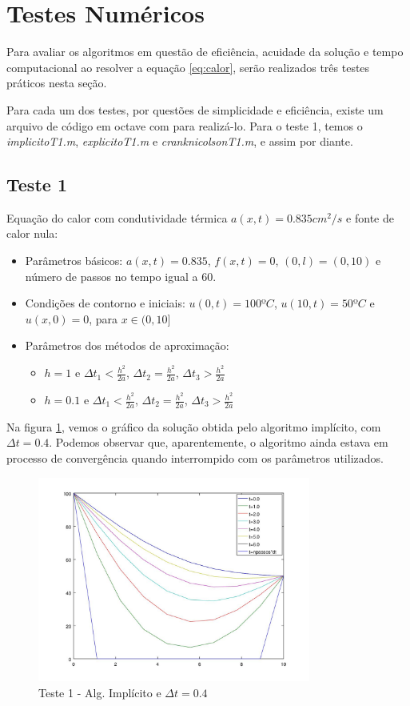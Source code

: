\documentclass[
	11pt,				%
	oneside,			%
	a4paper,			%
	english,			%
	brazil,				%
	]{article}
\begin{document}
\section{Testes Numéricos}
Para avaliar os algoritmos em questão de eficiência, acuidade da solução e 
tempo computacional ao resolver a equação \ref{eq:calor}, serão realizados três 
testes práticos nesta seção.

Para cada um dos testes, por questões de simplicidade e eficiência, existe um 
arquivo de código em octave com para realizá-lo. Para o teste 1, temos o 
\textit{implicitoT1.m}, \textit{explicitoT1.m} e \textit{cranknicolsonT1.m}, e 
assim por diante.

\subsection{Teste 1}
Equação do calor com condutividade térmica $a(x,t) = 0.835 cm^2/s$ e fonte de 
calor nula:

\begin{itemize}
 \item Parâmetros básicos:
 $a(x,t) = 0.835$, $f(x,t) = 0$, $(0,l) = (0,10)$ e número de passos no tempo 
igual a 60.
 \item Condições de contorno e iniciais:
 $u(0,t) = 100ºC$, $u(10,t) = 50ºC$ e $u(x,0) = 0$, para $x \in (0,10]$
 \item Parâmetros dos métodos de aproximação:
 \begin{itemize}
  \item $h = 1$ e $\Delta t_1 < \frac{h^2}{2a}$, $\Delta t_2 = 
\frac{h^2}{2a}$, $\Delta t_3 > \frac{h^2}{2a}$
  \item $h = 0.1$ e $\Delta t_1 < \frac{h^2}{2a}$, $\Delta t_2 = 
\frac{h^2}{2a}$, $\Delta t_3 > \frac{h^2}{2a}$
 \end{itemize}
\end{itemize}

Na figura \ref{fig:t1-imp}, vemos o gráfico da solução obtida pelo 
algoritmo implícito, com $\Delta t = 0.4$. Podemos observar que, 
aparentemente, o algoritmo ainda estava em processo de convergência quando 
interrompido com os parâmetros utilizados.

\begin{figure}[ht]
    \centering
    \includegraphics[width=0.8\textwidth]{teste1-imp-dt-04}
    \caption{Teste 1 - Alg. Implícito e $\Delta t = 0.4$}
    \label{fig:t1-imp}
\end{figure}
\end{document}
